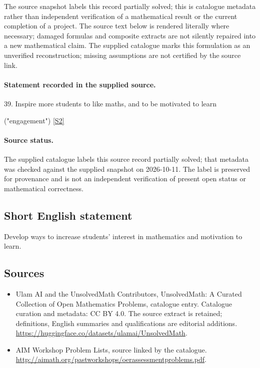 \documentclass[11pt]{article}
\begin{document}
The source snapshot labels this record partially solved; this is catalogue metadata rather than independent verification of a mathematical result or the current completion of a project.
The source text below is rendered literally where necessary; damaged formulas and composite extracts are not silently repaired into a new mathematical claim.
The supplied catalogue marks this formulation as an unverified reconstruction; missing assumptions are not certified by the source link.
\paragraph{Statement recorded in the supplied source.}
39. Inspire more students to like maths, and to be motivated to learn

("engagement") \href{http://aimath.org/pastworkshops/oerassessmentproblems.pdf}{[S2]}
\paragraph{Source status.}
The supplied catalogue labels this source record partially solved; that metadata was checked against the supplied snapshot on 2026-10-11. The label is preserved for provenance and is not an independent verification of present open status or mathematical correctness.
\subsection{Short English statement}
Develop ways to increase students' interest in mathematics and motivation to learn.
\subsection{Sources}
\begin{itemize}
\item[S1] Ulam AI and the UnsolvedMath Contributors, UnsolvedMath: A Curated Collection of Open Mathematics Problems, catalogue entry. Catalogue curation and metadata: CC BY 4.0. The source extract is retained; definitions, English summaries and qualifications are editorial additions.
\url{https://huggingface.co/datasets/ulamai/UnsolvedMath}.
\item[S2] AIM Workshop Problem Lists, source linked by the catalogue.
\url{http://aimath.org/pastworkshops/oerassessmentproblems.pdf}.
\end{itemize}
\end{document}
